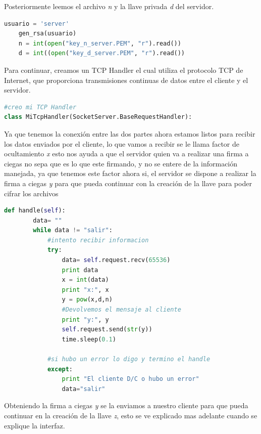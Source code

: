 Posteriormente leemos el archivo \textit{n} y la llave privada \textit{d} del servidor.

	\begin{lstlisting}[language=Python,frame=single, keywordstyle=\color{blue},showstringspaces=false]
	usuario = 'server'
	gen_rsa(usuario)
	n = int(open("key_n_server.PEM", "r").read())
	d = int((open("key_d_server.PEM", "r").read())
	\end{lstlisting}

Para continuar, creamos un TCP Handler el cual utiliza el protocolo TCP de Internet, que proporciona transmisiones continuas de datos entre el cliente y el servidor.

 
\begin{lstlisting}[language=Python,frame=single, keywordstyle=\color{blue},showstringspaces=false]
#creo mi TCP Handler
class MiTcpHandler(SocketServer.BaseRequestHandler):
\end{lstlisting}


Ya que tenemos la conexión entre las dos partes ahora estamos listos para recibir los datos enviados por el cliente, lo que vamos a recibir se le llama factor de ocultamiento  \textit{x} esto nos ayuda a que el servidor quien va a realizar una firma a ciegas no sepa que es lo que este firmando, y no se entere de la información manejada, ya que tenemos este factor ahora si, el servidor se dispone a realizar la firma a ciegas \textit{y} para que pueda continuar con la creación de la llave para poder cifrar los archivos

\begin{lstlisting}[language=Python,frame=single, keywordstyle=\color{blue},showstringspaces=false]
       def handle(self):
        data= ""
        while data != "salir":
            #intento recibir informacion
            try:
                data= self.request.recv(65536)
                print data
                x = int(data)
                print "x:", x
                y = pow(x,d,n)
				#Devolvemos el mensaje al cliente
                print "y:", y
                self.request.send(str(y))
                time.sleep(0.1)
			
            #si hubo un error lo digo y termino el handle
            except:
                print "El cliente D/C o hubo un error"
                data="salir"
\end{lstlisting}

Obteniendo la firma a ciegas \textit{y} se la enviamos a nuestro cliente para que pueda continuar en la creación de la llave \textit{z}, esto se ve explicado mas adelante cuando se explique la interfaz.



